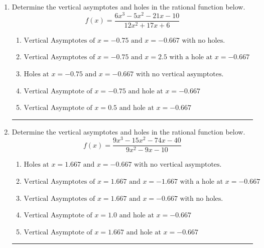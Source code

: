 \documentclass[14pt]{extbook}
\newcommand{\litem}[1]{\item#1\hspace*{-1cm}\rule{\textwidth}{0.4pt}}
\begin{document}
\begin{enumerate}
\litem{
Determine the vertical asymptotes and holes in the rational function below.\[ f(x) = \frac{6x^{3} -5 x^{2} -21 x -10}{12x^{2} +17 x + 6} \]\begin{enumerate}[label=\Alph*.]
\item \( \text{Vertical Asymptotes of } x = -0.75 \text{ and } x = -0.667 \text{ with no holes.} \)
\item \( \text{Vertical Asymptotes of } x = -0.75 \text{ and } x = 2.5 \text{ with a hole at } x = -0.667 \)
\item \( \text{Holes at } x = -0.75 \text{ and } x = -0.667 \text{ with no vertical asymptotes.} \)
\item \( \text{Vertical Asymptote of } x = -0.75 \text{ and hole at } x = -0.667 \)
\item \( \text{Vertical Asymptote of } x = 0.5 \text{ and hole at } x = -0.667 \)

\end{enumerate} }
\litem{
Determine the vertical asymptotes and holes in the rational function below.\[ f(x) = \frac{9x^{3} -15 x^{2} -74 x -40}{9x^{2} -9 x -10} \]\begin{enumerate}[label=\Alph*.]
\item \( \text{Holes at } x = 1.667 \text{ and } x = -0.667 \text{ with no vertical asymptotes.} \)
\item \( \text{Vertical Asymptotes of } x = 1.667 \text{ and } x = -1.667 \text{ with a hole at } x = -0.667 \)
\item \( \text{Vertical Asymptotes of } x = 1.667 \text{ and } x = -0.667 \text{ with no holes.} \)
\item \( \text{Vertical Asymptote of } x = 1.0 \text{ and hole at } x = -0.667 \)
\item \( \text{Vertical Asymptote of } x = 1.667 \text{ and hole at } x = -0.667 \)


\end{enumerate}}
\end{enumerate}
\end{document}
